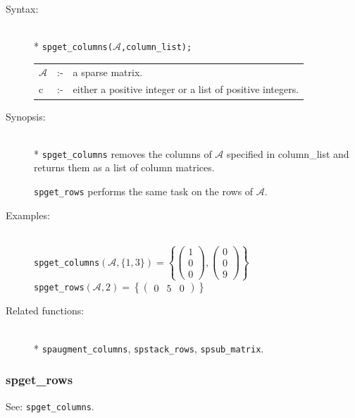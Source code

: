 \begin{description}
\item[Syntax:]\mbox{}\\*
{\tt spget\_columns($\mathcal{A}$,column\_list);}\\[2mm]
\begin{tabular}{l l l}
$\mathcal{A}$ &:-& a sparse matrix. \\
c          &:-& either a positive integer or a list of positive
                integers.
\end{tabular}

\item[Synopsis:]\mbox{}\\*
\texttt{spget\_columns} removes the columns of $\mathcal{A}$ specified in
                column\_list and returns them as a list of column
                matrices.

 \texttt{spget\_rows} performs the same task on the rows of
                $\mathcal{A}$.

\item[Examples:]\mbox{}\\
\texttt{spget\_columns}\((\mathcal{A},\{1,3\})  =
\left\{
        \begin{pmatrix} 1 \\ 0 \\ 0 \end{pmatrix},
        \begin{pmatrix} 0 \\ 0 \\ 9 \end{pmatrix}
\right\}\) \\[2mm]
\texttt{spget\_rows}\((\mathcal{A},2) =
\left\{
        \begin{pmatrix} 0 & 5 & 0 \end{pmatrix}
\right\}\)

\item[Related functions:]\mbox{}\\*
\texttt{spaugment\_columns}, \texttt{spstack\_rows},
\texttt{spsub\_matrix}.

\end{description}

\subsubsection{spget\_rows}
\label{sparse:spget_rows}
\hypertarget{operator:SPGET_ROWS}{}
See: \texttt{spget\_columns}.


